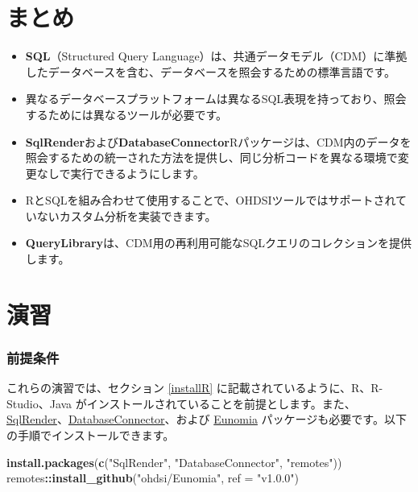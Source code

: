 \documentclass[
  11pt]{book}
\makeatletter
\newenvironment{Shaded}{\begin{snugshade}}{\end{snugshade}}
\newcommand{\AttributeTok}[1]{\textcolor[rgb]{0.13,0.29,0.53}{#1}}
\newcommand{\FunctionTok}[1]{\textcolor[rgb]{0.13,0.29,0.53}{\textbf{#1}}}
\newcommand{\NormalTok}[1]{#1}
\newcommand{\SpecialCharTok}[1]{\textcolor[rgb]{0.81,0.36,0.00}{\textbf{#1}}}
\newcommand{\StringTok}[1]{\textcolor[rgb]{0.31,0.60,0.02}{#1}}
\newenvironment{kframe}{%
\medskip{}
\setlength{\fboxsep}{.8em}
 \def\at@end@of@kframe{}%
 \ifinner\ifhmode%
  \def\at@end@of@kframe{\end{minipage}}%
  \begin{minipage}{\columnwidth}%
 \fi\fi%
 \def\FrameCommand##1{\hskip\@totalleftmargin \hskip-\fboxsep
 \colorbox{myShadeColor}{##1}\hskip-\fboxsep
     \hskip-\linewidth \hskip-\@totalleftmargin \hskip\columnwidth}%
 \MakeFramed {\advance\hsize-\width
   \@totalleftmargin\z@ \linewidth\hsize
   \@setminipage}}%
 {\par\unskip\endMakeFramed%
 \at@end@of@kframe}
\newenvironment{rmdblock}[1]
  {
  \begin{itemize}
  \renewcommand{\labelitemi}{
    \raisebox{-.7\height}[0pt][0pt]{
      {\setkeys{Gin}{width=3em,keepaspectratio}\texttt{[image: images/\#1]}}
    }
  }
  \setlength{\fboxsep}{1em}
  \begin{kframe}
  \item
  }
  {
  \end{kframe}
  \end{itemize}
  }
\newenvironment{rmdsummary}
  {\begin{rmdblock}{summary}}
  {\end{rmdblock}}
\theoremstyle{definition}
\theoremstyle{definition}
\theoremstyle{definition}
\theoremstyle{definition}
\theoremstyle{remark}
\makeatother
\begin{document}
\section{まとめ}\label{ux307eux3068ux3081-7}

\begin{rmdsummary}
\begin{itemize}
\item
  \textbf{SQL}（Structured Query Language）は、共通データモデル（CDM）に準拠したデータベースを含む、データベースを照会するための標準言語です。
\item
  異なるデータベースプラットフォームは異なるSQL表現を持っており、照会するためには異なるツールが必要です。
\item
  \textbf{SqlRender}および\textbf{DatabaseConnector}Rパッケージは、CDM内のデータを照会するための統一された方法を提供し、同じ分析コードを異なる環境で変更なしで実行できるようにします。
\item
  RとSQLを組み合わせて使用することで、OHDSIツールではサポートされていないカスタム分析を実装できます。
\item
  \textbf{QueryLibrary}は、CDM用の再利用可能なSQLクエリのコレクションを提供します。
\end{itemize}
\end{rmdsummary}

\section{演習}\label{ux6f14ux7fd2-4}

\subsubsection*{前提条件}\label{ux524dux63d0ux6761ux4ef6-3}

これらの演習では、セクション \ref{installR} に記載されているように、R、R-Studio、Java がインストールされていることを前提とします。また、\href{https://ohdsi.github.io/SqlRender/}{SqlRender}、\href{https://ohdsi.github.io/DatabaseConnector/}{DatabaseConnector}、および \href{https://ohdsi.github.io/Eunomia/}{Eunomia} パッケージも必要です。以下の手順でインストールできます。

\begin{Shaded}
\begin{Highlighting}[]
\FunctionTok{install.packages}\NormalTok{(}\FunctionTok{c}\NormalTok{(}\StringTok{"SqlRender"}\NormalTok{, }\StringTok{"DatabaseConnector"}\NormalTok{, }\StringTok{"remotes"}\NormalTok{))}
\NormalTok{remotes}\SpecialCharTok{::}\FunctionTok{install\_github}\NormalTok{(}\StringTok{"ohdsi/Eunomia"}\NormalTok{, }\AttributeTok{ref =} \StringTok{"v1.0.0"}\NormalTok{)}
\end{Highlighting}
\end{Shaded}
\end{document}
